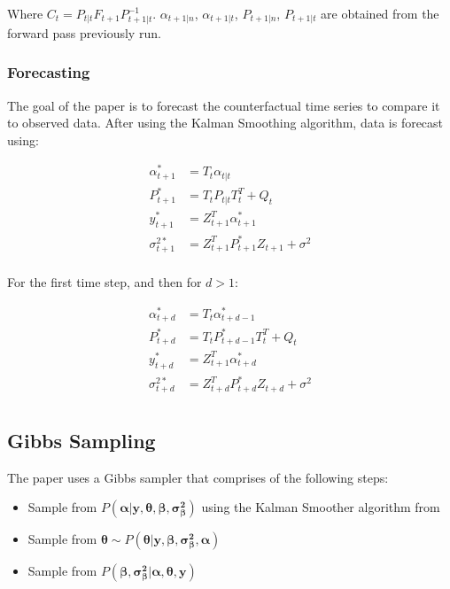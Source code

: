 \documentclass[12pt]{article}
\begin{document}
Where $C_t = P_{t|t}F_{t+1}P_{t+1|t}^{-1}$. $\alpha_{t+1|n}$, $\alpha_{t+1|t}$, $P_{t+1|n}$, $P_{t+1|t}$ are obtained from the forward pass previously run. 

\subsubsection{Forecasting}
The goal of the paper is to forecast the counterfactual time series to compare it to observed data. After using the Kalman Smoothing algorithm, data is forecast using:

\begin{align*}
    \alpha^*_{t + 1}& =  T_{t} \alpha_{t|t} \\
    P^*_{t + 1}& =  T_{t} P_{t|t} T_t^T + Q_t\\
    y^*_{t + 1} &= Z_{t + 1}^T \alpha^*_{t + 1}\\
    \sigma^{2*}_{t + 1} &= Z_{t + 1}^T P^*_{t + 1}Z_{t + 1} + \sigma^2\\
\end{align*}

For the first time step, and then for $d > 1$:


\begin{align*}
    \alpha^*_{t + d}& =  T_{t} \alpha^*_{t + d -1} \\
    P^*_{t + d}& =  T_{t} P^*_{t + d - 1} T_t^T + Q_t\\
    y^*_{t + d} &= Z_{t + 1}^T \alpha^*_{t + d}\\
    \sigma^{2*}_{t + d} &= Z_{t + d}^T P^*_{t + d}Z_{t + d} + \sigma^2\\
\end{align*}


\subsection{Gibbs Sampling}
The paper uses a Gibbs sampler that comprises of the following steps:
\begin{itemize}
    \item Sample from $P(\boldsymbol{\alpha}|\boldsymbol{y}, \boldsymbol{\theta}, \boldsymbol{\beta},  \boldsymbol{\sigma^2_{\beta}})$ using the Kalman Smoother algorithm from \cite{durbin2002simple}
    \item Sample from $\boldsymbol{\theta}\sim P(\boldsymbol{\theta}|\boldsymbol{y}, \boldsymbol{\beta},  \boldsymbol{\sigma^2_{\beta}}, \boldsymbol{\alpha})$
    \item Sample from $P(\boldsymbol{\beta},\boldsymbol{\sigma^2_{\beta}}|\boldsymbol{\alpha}, \boldsymbol{\theta}, \boldsymbol{y})$
\end{itemize}
\end{document}

